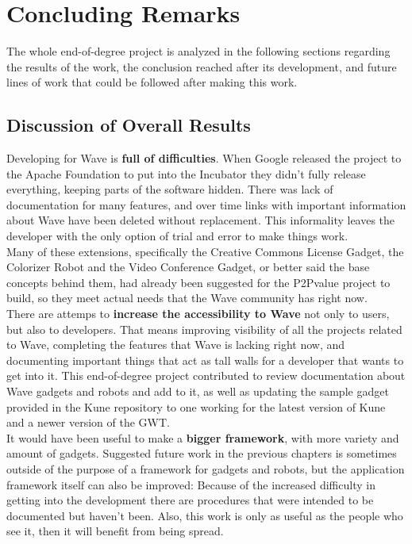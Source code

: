 \chapter{Concluding Remarks}
The whole end-of-degree project is analyzed in the following sections regarding the results of the work, the conclusion reached after its development, and future lines of work that could be followed after making this work.
\section{Discussion of Overall Results}
Developing for Wave is \textbf{full of difficulties}. When Google released the project to the Apache Foundation to put into the Incubator they didn't fully release everything, keeping parts of the software hidden. There was lack of documentation for many features, and over time links with important information about Wave have been deleted without replacement. This informality leaves the developer with the only option of trial and error to make things work.\\[.2cm]
Many of these extensions, specifically the Creative Commons License Gadget, the Colorizer Robot and the Video Conference Gadget, or better said the base concepts behind them, had already been suggested for the P2Pvalue project to build, so they meet actual needs that the Wave community has right now.\\[.2cm]
There are attemps to \textbf{increase the accessibility to Wave} not only to users, but also to developers. That means improving visibility of all the projects related to Wave, completing the features that Wave is lacking right now, and documenting important things that act as tall walls for a developer that wants to get into it. This end-of-degree project contributed to review documentation about Wave gadgets and robots and add to it, as well as updating the sample gadget provided in the Kune repository to one working for the latest version of Kune and a newer version of the GWT.\\[.2cm]
It would have been useful to make a \textbf{bigger framework}, with more variety and amount of gadgets. Suggested future work in the previous chapters is sometimes outside of the purpose of a framework for gadgets and robots, but the application framework itself can also be improved: Because of the increased difficulty in getting into the development there are procedures that were intended to be documented but haven't been. Also, this work is only as useful as the people who see it, then it will benefit from being spread.\\[.2cm]
